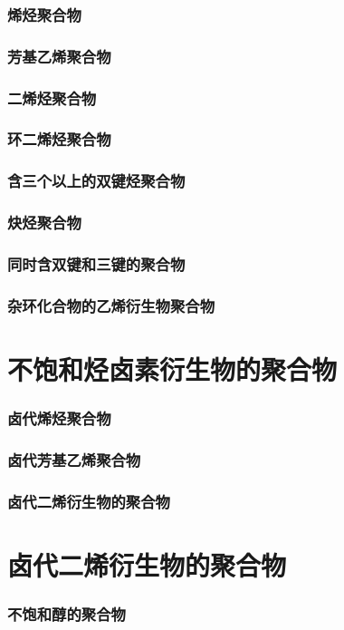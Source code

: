\documentclass[UTF8]{../03-Chemistry}
\begin{document}
    \subsubsection{烯烃聚合物}
    \subsubsection{芳基乙烯聚合物}
    \subsubsection{二烯烃聚合物}
    \subsubsection{环二烯烃聚合物}
    \subsubsection{含三个以上的双键烃聚合物}
    \subsubsection{炔烃聚合物}
    \subsubsection{同时含双键和三键的聚合物}
    \subsubsection{杂环化合物的乙烯衍生物聚合物}
\section{不饱和烃卤素衍生物的聚合物}
    \subsubsection{卤代烯烃聚合物}
    \subsubsection{卤代芳基乙烯聚合物}
    \subsubsection{卤代二烯衍生物的聚合物}
\section{卤代二烯衍生物的聚合物}
    \subsubsection{不饱和醇的聚合物}
\end{document}
